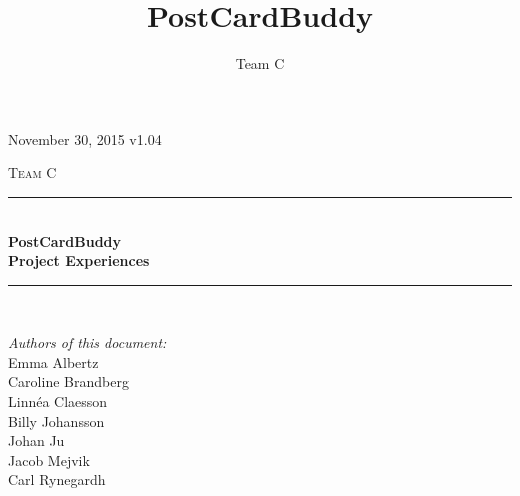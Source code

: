 \documentclass[10pt,a4paper]{article}
\title{PostCardBuddy}
\author{Team C}
\begin{document}
\begin{titlepage}
\newcommand{\HRule}{\rule{\linewidth}{0.5mm}}


\begin{flushright}
November 30, 2015 v1.04\\[3cm]
\end{flushright}


\centering
\textsc{\LARGE Team C}\\[0.5cm]

\HRule \\[0.4cm]
{ \huge \bfseries PostCardBuddy}\\[0.3cm]
{\Large \bfseries Project Experiences}\\[0.4cm] %
\HRule \\[1.5cm]

\vfill
\begin{flushleft}
\textit{Authors of this document:}\\
Emma Albertz\\
Caroline Brandberg\\
Linnéa Claesson\\
Billy Johansson\\
Johan Ju\\
Jacob Mejvik\\
Carl Rynegardh
\end{flushleft}

\end{titlepage}



%



\setcounter{tocdepth}{2}
\tableofcontents
\newpage
{}

\end{document}
